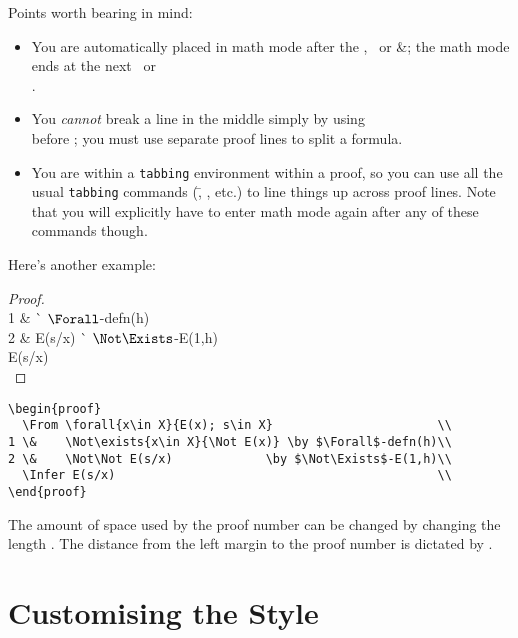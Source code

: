 {Points worth bearing in mind:
\begin{itemize}
\item	You are automatically placed in math mode after the
	\cs\From, \cs\Infer\ or \cs\&; the math mode ends
	at the next \cs\by\ or \cs\\.
\item	You {\em cannot} break a line in the middle simply by using
	\cs\\ before \cs\by; you must use separate proof lines
	to split a formula.
\item	You are within a {\tt tabbing} environment within a proof, so
	you can use all the usual {\tt tabbing} commands (\cs\=,
	\cs\>, etc.) to line things up across proof lines.  Note
	that you will explicitly have to enter math mode again after
	any of these commands though.
\end{itemize}

Here's another example:

\begin{proof}
  \From {}	\\
1 \&	\Not{}	\` $\Forall$-defn(h)\\
2 \&	\Not\Not E(s/x)	\` $\Not\Exists$-E(1,h)\\
  \Infer E(s/x)				\\
\end{proof}
\begin{verbatim}
\begin{proof}
  \From \forall{x\in X}{E(x); s\in X}                       \\
1 \&    \Not\exists{x\in X}{\Not E(x)} \by $\Forall$-defn(h)\\
2 \&    \Not\Not E(s/x)             \by $\Not\Exists$-E(1,h)\\
  \Infer E(s/x)                                             \\
\end{proof}
\end{verbatim}

\begin{dangerous}
The amount of space used by the proof number can be changed by
changing the length \cs\ProofNumberWidth.  The distance from the
left margin to the proof number is dictated by \cs\ProofIndent.
\end{dangerous}


\section*{Customising the Style}

}
